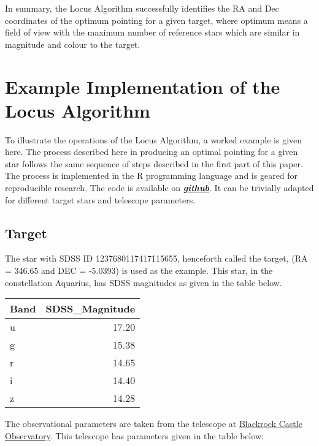 \documentclass[]{elsarticle} %
\begin{document}
In summary, the Locus Algorithm successfully identifies the RA and Dec
coordinates of the optimum pointing for a given target, where optimum
means a field of view with the maximum number of reference stars which
are similar in magnitude and colour to the target.

\newpage

\hypertarget{example-implementation-of-the-locus-algorithm}{%
\section{Example Implementation of the Locus
Algorithm}\label{example-implementation-of-the-locus-algorithm}}

To illustrate the operations of the Locus Algorithm, a worked example is
given here. The process described here in producing an optimal pointing
for a given star follows the same sequence of steps described in the
first part of this paper. The process is implemented in the R
programming language and is geared for reproducible research. The code
is available on
\emph{\textbf{\href{https://github.com/eugene100hickey/LocusAlgorithm}{github}}}.
It can be trivially adapted for different target stars and telescope
parameters.

\hypertarget{target}{%
\subsection{Target}\label{target}}

The star with SDSS ID 1237680117417115655, henceforth called the target,
(RA = 346.65 and DEC = -5.0393) is used as the example. This star, in
the constellation Aquarius, has SDSS magnitudes as given in the table
below. \vskip 0.2in

\begin{table}[H]
\centering
\begin{tabular}{l|r}
\hline
Band & SDSS\_Magnitude\\
\hline
u & 17.20\\
\hline
g & 15.38\\
\hline
r & 14.65\\
\hline
i & 14.40\\
\hline
z & 14.28\\
\hline
\end{tabular}
\end{table}

The observational parameters are taken from the telescope at
\href{www.bco.ie}{Blackrock Castle Observatory}. This telescope has
parameters given in the table below: \vskip 0.2in
\end{document}
